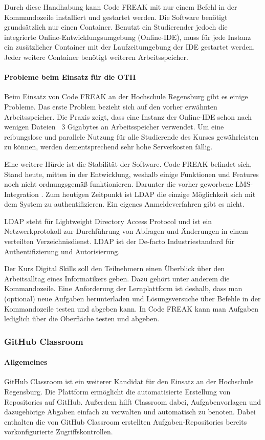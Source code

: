 Durch diese Handhabung kann Code FREAK mit nur einem Befehl in der
Kommandozeile installiert und gestartet werden. Die Software benötigt
grundsätzlich nur einen Container. Benutzt ein Studierender jedoch die
integrierte Online-Entwicklungsumgebung (Online-IDE), muss für jede Instanz ein
zusätzlicher Container mit der Laufzeitumgebung der IDE gestartet werden. Jeder
weitere Container benötigt weiteren Arbeitsspeicher.

\paragraph{Probleme beim Einsatz für die OTH}
Beim Einsatz von Code FREAK an der Hochschule Regensburg gibt es einige
Probleme. Das erste Problem bezieht sich auf den vorher erwähnten
Arbeitsspeicher. Die Praxis zeigt, dass eine Instanz der Online-IDE schon nach
wenigen Dateien ~3 Gigabytes an Arbeitsspeicher verwendet. Um eine reibungslose
und parallele Nutzung für alle Studierende des Kurses gewährleisten zu können,
werden dementsprechend sehr hohe Serverkosten fällig. 
\cite{codefreak-memory-problem}

Eine weitere Hürde ist die Stabilität der Software. Code FREAK befindet sich,
Stand heute, mitten in der Entwicklung, weshalb einige Funktionen und Features
noch nicht ordnungsgemäß funktionieren. Darunter die vorher geworbene
LMS-Integration \cite{codefreak-docs}. Zum heutigen Zeitpunkt ist LDAP die
einzige Möglichkeit sich mit dem System zu authentifizieren. Ein eigenes
Anmeldeverfahren gibt es nicht.

LDAP steht für \glqq Lightweight Directory Access Protocol\grqq{} und ist ein
Netzwerkprotokoll zur Durchführung von Abfragen und Änderungen in einem 
verteilten Verzeichnisdienst. LDAP ist der De-facto Industriestandard für
Authentifizierung und Autorisierung. \cite{ldap}

Der Kurs Digital Skills soll den Teilnehmern einen Überblick über den
Arbeitsalltag eines Informatikers geben. Dazu gehört unter anderem die
Kommandozeile. Eine Anforderung der Lernplattform ist deshalb, dass man
(optional) neue Aufgaben herunterladen und Lösungsversuche über Befehle in der
Kommandozeile testen und abgeben kann. In Code FREAK kann man Aufgaben lediglich
über die Oberfläche testen und abgeben.

\newpage
\subsubsection{GitHub Classroom}
\paragraph{Allgemeines}
GitHub Classroom ist ein weiterer Kandidat für den Einsatz an der
Hochschule Regensburg. Die Plattform ermöglicht die automatisierte
Erstellung von Repositories auf GitHub. Außerdem hilft Classroom dabei,
Aufgabenvorlagen und dazugehörige Abgaben einfach zu verwalten und automatisch
zu benoten. Dabei enthalten die von GitHub Classroom erstellten
Aufgaben-Repositories bereits vorkonfigurierte Zugriffskontrollen. \cite{github-classroom-startseite}

